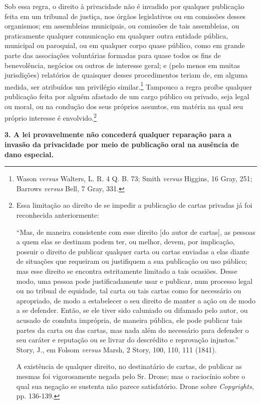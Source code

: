 Sob essa regra, o direito à privacidade não é invadido por qualquer
publicação feita em um tribunal de justiça, nos órgãos legislativos ou
em comissões desses organismos; em assembleias municipais, ou comissões
de tais assembleias, ou praticamente qualquer comunicação em qualquer
outra entidade pública, municipal ou paroquial, ou em qualquer corpo
quase público, como em grande parte das associações voluntárias formadas
para quase todos os fins de benevolência, negócios ou outros de
interesse geral; e (pelo menos em muitas jurisdições) relatórios de
quaisquer desses procedimentos teriam de, em alguma medida, ser
atribuídos um privilégio similar.\footnote{Wason \emph{versus} Walters,
  L. R. 4 Q. B. 73; Smith \emph{versus} Higgins, 16 Gray, 251; Barrows
  \emph{versus} Bell, 7 Gray, 331.} Tampouco a regra proíbe qualquer
publicação feita por alguém afastado de um cargo público ou privado,
seja legal ou moral, ou na condução dos seus próprios assuntos, em
matéria na qual seu próprio interesse é envolvido.\footnote{Essa
  limitação ao direito de se impedir a publicação de cartas privadas já
  foi reconhecida anteriormente:

  ``Mas, de maneira consistente com esse direito {[}do autor de
  cartas{]}, as pessoas a quem elas se destinam podem ter, ou melhor,
  devem, por implicação, possuir o direito de publicar qualquer carta ou
  cartas enviadas a elas diante de situações que requeiram ou
  justifiquem a sua publicação ou uso público; mas esse direito se
  encontra estritamente limitado a tais ocasiões. Desse modo, uma pessoa
  pode justificadamente usar e publicar, num processo legal ou no
  tribual de equidade, tal carta ou tais cartas como for necessário ou
  apropriado, de modo a estabelecer o seu direito de manter a ação ou de
  modo a se defender. Então, se ele tiver sido caluniado ou difamado
  pelo autor, ou acusado de conduta imprópria, de maneira pública, ele
  pode publicar tais partes da carta ou das cartas, mas nada além do
  necessário para defender o seu caráter e reputação ou se livrar do
  descrédito e reprovação injustos.'' Story, J., em Folsom \emph{versus}
  Marsh, 2 Story, 100, 110, 111 (1841).

  A existência de qualquer direito, no destinatário de cartas, de
  publicar as mesmas foi vigorosamente negada pelo Sr. Drone; mas o
  raciocínio sobre o qual sua negação se sustenta não parece
  satisfatório. Drone sobre \emph{Copyrights}, pp. 136-139.}

\textbf{3. A lei provavelmente não concederá qualquer reparação para a
invasão da privacidade por meio de publicação oral na ausência de dano
especial.}

